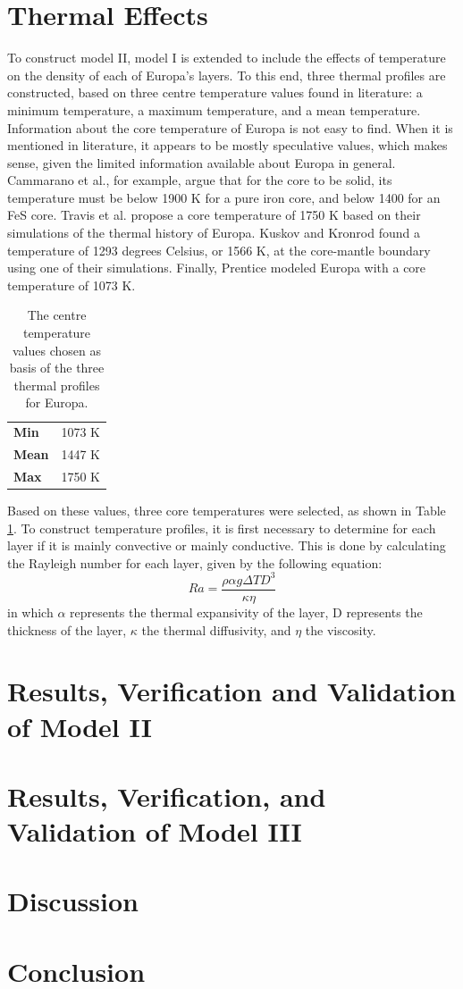 \documentclass[twocolumn]{article}
\begin{document}
\section{Thermal Effects}
To construct model II, model I is extended to include the effects of temperature on the density of each of Europa's layers. To this end, three thermal profiles are constructed, based on three centre temperature values found in literature: a minimum temperature, a maximum temperature, and a mean temperature.\\
Information about the core temperature of Europa is not easy to find. When it is mentioned in literature, it appears to be mostly speculative values, which makes sense, given the limited information available about Europa in general. Cammarano et al.\cite{cammaranoLongperiodSeismologyEuropa2006}, for example, argue that for the core to be solid, its temperature must be below 1900 K for a pure iron core, and below 1400 for an FeS core. Travis et al.\cite{travisWholemoonThermalHistory2012} propose a core temperature of 1750 K based on their simulations of the thermal history of Europa. Kuskov and Kronrod\cite{kronrodChemicalDifferentiationGalilean2006} found a temperature of 1293 degrees Celsius, or 1566 K, at the core-mantle boundary using one of their simulations. Finally, Prentice\cite{prenticeORIGINBULKCHEMICAL1999} modeled Europa with a core temperature of 1073 K.\\
\begin{table}[h]
	\centering
	\caption{The centre temperature values chosen as basis of the three thermal profiles for Europa.}
	\label{tab:coretemps}
		\begin{tabular}{l|l}
			\textbf{Min}  & 1073 K \\
			\textbf{Mean} & 1447 K \\
			\textbf{Max}  & 1750 K
		\end{tabular}%
\end{table}
Based on these values, three core temperatures were selected, as shown in Table \ref{tab:coretemps}. To construct temperature profiles, it is first necessary to determine for each layer if it is mainly convective or mainly conductive. This is done by calculating the Rayleigh number for each layer, given by the following equation:
\begin{equation}
	Ra = \frac{\rho\alpha g\Delta TD^3}{\kappa\eta}
\end{equation}
in which $\alpha$ represents the thermal expansivity of the layer, D represents the thickness of the layer, $\kappa$ the thermal diffusivity, and $\eta$ the viscosity.
\section{Results, Verification and Validation of Model II}
\section{Results, Verification, and Validation of Model III}
\label{sec:model3}
\section{Discussion}
\section{Conclusion}



\end{document}
